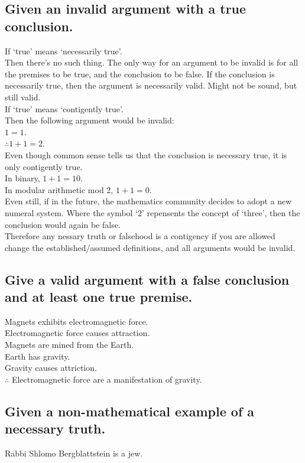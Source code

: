 \documentclass[10pt, letterpaper, titlepage]{article}
\begin{document}
        \subsection{Given an invalid argument with a true conclusion.}
            If `true' means `necessarily true'.\\
            Then there's no such thing. The only way for an argument to be invalid is for all the premises to be true, 
            and the conclusion to be false. If the conclusion is necessarily true, then the argument is necessarily valid. 
            Might not be sound, but still valid.\\
            If `true' means `contigently true'.\\
            Then the following argument would be invalid:\\
            $1 = 1$.\\
            $\therefore 1 + 1 = 2$.\\
            Even though common sense tells us that the conclusion is necessary true, it is only contigently true. \\
            In binary, $1 + 1 = 10$.\\
            In modular arithmetic mod 2, $1 + 1 = 0$.\\
            Even still, if in the future, the mathematics community decides to adopt a new numeral system.
            Where the symbol `2' repensents the concept of `three', then the conclusion would again be false.\\
            Therefore any nessary truth or falsehood is a contigency if you are allowed change the established/assumed definitions,
            and all arguments would be invalid.
        \subsection{Give a valid argument with a false conclusion and at least one true premise.}
            Magnets exhibits electromagnetic force.\\
            Electromagnetic force causes attraction.\\
            Magnets are mined from the Earth.\\
            Earth has gravity.\\
            Gravity causes attriction.\\
            $\therefore$ Electromagnetic force are a manifestation of gravity.
        \subsection{Given a non-mathematical example of a necessary truth.}
            Rabbi Shlomo Bergblattstein is a jew.
\end{document}

